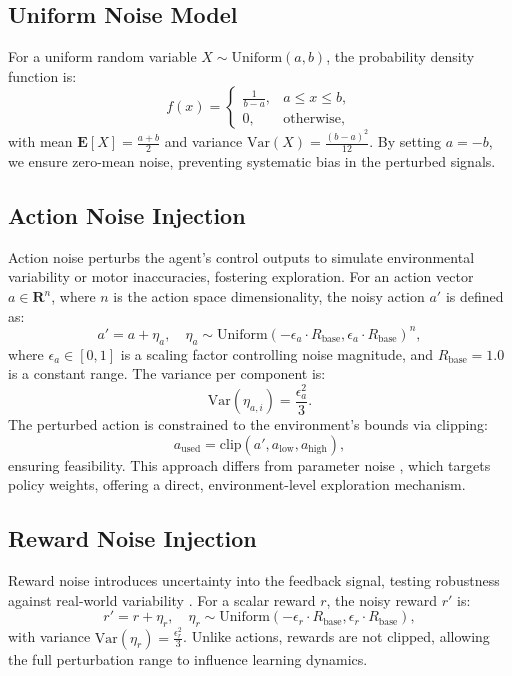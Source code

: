 \documentclass{svproc}
\begin{document}
\subsection{Uniform Noise Model}
For a uniform random variable $X \sim \text{Uniform}(a, b)$, the probability density function is:
\begin{equation}
f(x) = 
\begin{cases} 
\frac{1}{b - a}, & a \leq x \leq b, \\
0, & \text{otherwise},
\end{cases}
\end{equation}
with mean $\mathbf{E}[X] = \frac{a + b}{2}$ and variance $\text{Var}(X) = \frac{(b - a)^2}{12}$. By setting $a = -b$, we ensure zero-mean noise, preventing systematic bias in the perturbed signals.

\subsection{Action Noise Injection}
Action noise perturbs the agent’s control outputs to simulate environmental variability or motor inaccuracies, fostering exploration. For an action vector $a \in \mathbf{R}^n$, where $n$ is the action space dimensionality, the noisy action $a'$ is defined as:
\begin{equation}
a' = a + \eta_a, \quad \eta_a \sim \text{Uniform}(-\epsilon_a \cdot R_{\text{base}}, \epsilon_a \cdot R_{\text{base}})^n,
\end{equation}
where $\epsilon_a \in [0, 1]$ is a scaling factor controlling noise magnitude, and $R_{\text{base}} = 1.0$ is a constant range. The variance per component is:
\begin{equation}
\text{Var}(\eta_{a,i}) = \frac{\epsilon_a^2}{3}.
\end{equation}
The perturbed action is constrained to the environment’s bounds via clipping:
\begin{equation}
a_{\text{used}} = \text{clip}(a', a_{\text{low}}, a_{\text{high}}),
\end{equation}
ensuring feasibility. This approach differs from parameter noise \cite{plappert2018parameterspacenoiseexploration}, which targets policy weights, offering a direct, environment-level exploration mechanism.

\subsection{Reward Noise Injection}
Reward noise introduces uncertainty into the feedback signal, testing robustness against real-world variability \cite{wang2020reinforcementlearningperturbedrewards}. For a scalar reward $r$, the noisy reward $r'$ is:
\begin{equation}
r' = r + \eta_r, \quad \eta_r \sim \text{Uniform}(-\epsilon_r \cdot R_{\text{base}}, \epsilon_r \cdot R_{\text{base}}),
\end{equation}
with variance $\text{Var}(\eta_r) = \frac{\epsilon_r^2}{3}$. Unlike actions, rewards are not clipped, allowing the full perturbation range to influence learning dynamics.
\end{document}
